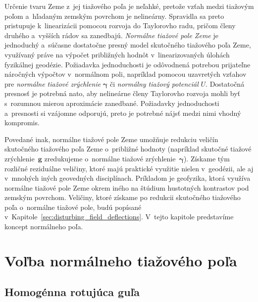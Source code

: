 \documentclass[a4paper, 12pt]{book}
\let\vec\mathbf
\begin{document}
Určenie tvaru Zeme z~jej tiažového poľa je neľahké, pretože vzťah medzi 
tiažovým poľom a~hľadaným zemským povrchom je nelineárny.  Spravidla sa preto 
pristupuje k~linearizácii pomocou rozvoja do Taylorovho radu, pričom členy 
druhého a~vyšších rádov sa zanedbajú.  \emph{Normálne tiažové pole Zeme} je 
jednoduchý a~súčasne dostatočne presný model skutočného tiažového poľa Zeme, 
využívaný práve na výpočet približných hodnôt v~linearizovaných úlohách 
fyzikálnej geodézie.  Požiadavka jednoduchosti je odôvodnená potrebou 
prijateľne náročných výpočtov v~normálnom poli, napríklad pomocou uzavretých 
vzťahov pre \emph{normálne tiažové zrýchlenie} $\boldsymbol{\gamma}$ či 
\emph{normálny tiažový potenciál} $U$.  Dostatočná presnosť je potrebná nato, 
aby nelineárne členy Taylorovho rozvoja mohli byť s~rozumnou mierou aproximácie 
zanedbané.  Požiadavky jednoduchosti a~presnosti si vzájomne odporujú, preto je 
potrebné nájsť medzi nimi vhodný kompromis.

Povedané inak, normálne tiažové pole Zeme umožňuje redukciu veličín skutočného 
tiažového poľa Zeme o~približné hodnoty (napríklad skutočné tiažové 
zrýchlenie~$\vec g$ zredukujeme o~normálne tiažové 
zrýchlenie~$\boldsymbol{\gamma}$).  Získame tým rozličné reziduálne veličiny, 
ktoré majú praktické využitie nielen v~geodézii, ale aj v~mnohých iných 
geovedných disciplínach.  Príkladom je geofyzika, ktorá využíva normálne 
tiažové pole Zeme okrem iného na štúdium hustotných kontrastov pod zemským 
povrchom.  Veličiny, ktoré získame po redukcii skutočného tiažového poľa 
o~normálne tiažové pole, budú popísané 
v~Kapitole~\ref{sec:disturbing_field_deflections}.  V~tejto kapitole 
predstavíme koncept normálneho poľa.

\section{Voľba normálneho tiažového poľa}
\label{sec:choice_of_normal_gravity_field}

\subsection{Homogénna rotujúca guľa}
\label{sec:normal_field_ball}
\end{document}
